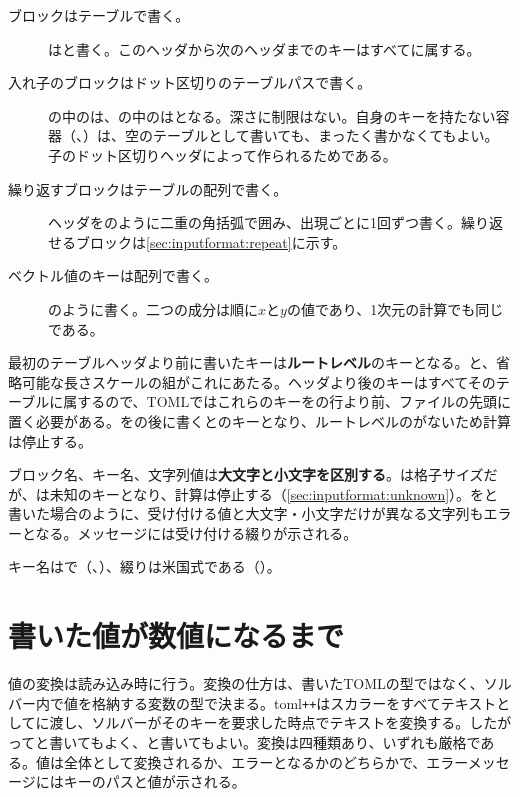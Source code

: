 \begin{description}
  \item[ブロックはテーブルで書く。]は\code{[Grid]}と書く。このヘッダから次のヘッダまでのキーはすべてに属する。
  \item[入れ子のブロックはドット区切りのテーブルパスで書く。]の中のは、の中のはとなる。深さに制限はない。自身のキーを持たない容器（\code{[Initial]}、\code{[Physics]}）は、空のテーブルとして書いても、まったく書かなくてもよい。子のドット区切りヘッダによって作られるためである。
  \item[繰り返すブロックはテーブルの配列で書く。]ヘッダをのように二重の角括弧で囲み、出現ごとに1回ずつ書く。繰り返せるブロックは\cref{sec:inputformat:repeat}に示す。
  \item[ベクトル値のキーは配列で書く。]のように書く。二つの成分は順に$x$と$y$の値であり、1次元の計算でも同じである。
\end{description}

最初のテーブルヘッダより前に書いたキーは\textbf{ルートレベル}のキーとなる。と、省略可能な長さスケールの組がこれにあたる。ヘッダより後のキーはすべてそのテーブルに属するので、TOMLではこれらのキーを\code{[...]}の行より前、ファイルの先頭に置く必要がある。を\code{[Grid]}の後に書くとのキーとなり、ルートレベルのがないため計算は停止する。

ブロック名、キー名、文字列値は\textbf{大文字と小文字を区別する}。は格子サイズだが、は未知のキーとなり、計算は停止する（\cref{sec:inputformat:unknown}）。をと書いた場合のように、受け付ける値と大文字・小文字だけが異なる文字列もエラーとなる。メッセージには受け付ける綴りが示される。

キー名はで（、）、綴りは米国式である（）。

\section{書いた値が数値になるまで}
\label{sec:inputformat:types}

値の変換は読み込み時に行う。変換の仕方は、書いたTOMLの型ではなく、ソルバー内で値を格納する変数の型で決まる。toml\texttt{++}はスカラーをすべてテキストとしてに渡し、ソルバーがそのキーを要求した時点でテキストを変換する。したがってと書いてもよく、と書いてもよい。変換は四種類あり、いずれも厳格である。値は全体として変換されるか、エラーとなるかのどちらかで、エラーメッセージにはキーのパスと値が示される。

